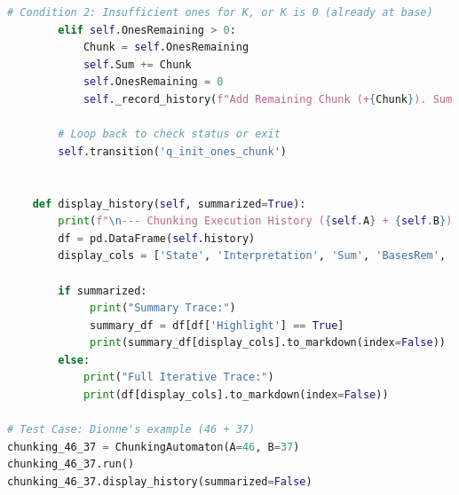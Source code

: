 \documentclass[11pt]{article}
\begin{document}
\begin{lstlisting}[language=Python]
        # Condition 2: Insufficient ones for K, or K is 0 (already at base)
        elif self.OnesRemaining > 0:
            Chunk = self.OnesRemaining
            self.Sum += Chunk
            self.OnesRemaining = 0
            self._record_history(f"Add Remaining Chunk (+{Chunk}). Sum = {self.Sum}.", highlight=True)

        # Loop back to check status or exit
        self.transition('q_init_ones_chunk')


    def display_history(self, summarized=True):
        print(f"\n--- Chunking Execution History ({self.A} + {self.B}) ---")
        df = pd.DataFrame(self.history)
        display_cols = ['State', 'Interpretation', 'Sum', 'BasesRem', 'OnesRem', 'K']

        if summarized:
             print("Summary Trace:")
             summary_df = df[df['Highlight'] == True]
             print(summary_df[display_cols].to_markdown(index=False))
        else:
            print("Full Iterative Trace:")
            print(df[display_cols].to_markdown(index=False))

# Test Case: Dionne's example (46 + 37)
chunking_46_37 = ChunkingAutomaton(A=46, B=37)
chunking_46_37.run()
chunking_46_37.display_history(summarized=False)
\end{lstlisting}
\end{document}
